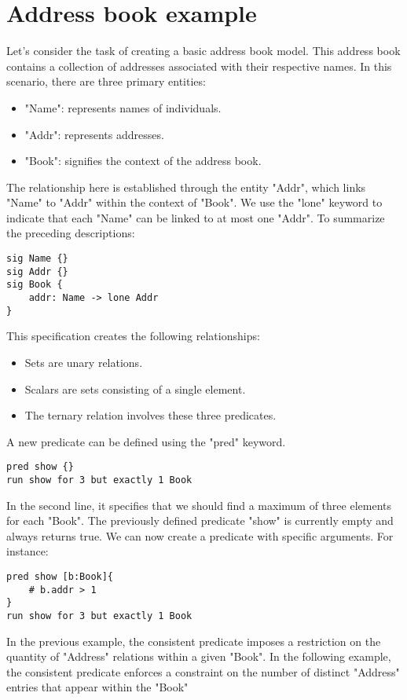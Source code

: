 \section{Address book example}

Let's consider the task of creating a basic address book model. 
This address book contains a collection of addresses associated with their respective names.
In this scenario, there are three primary entities:
\begin{itemize}
    \item "Name": represents names of individuals.
    \item "Addr": represents addresses.
    \item "Book": signifies the context of the address book.
\end{itemize}
The relationship here is established through the entity "Addr", which links "Name" to "Addr" within the context of "Book". 
We use the "lone" keyword to indicate that each "Name" can be linked to at most one "Addr". To summarize the preceding descriptions:
\begin{lstlisting}[language=alloy]
sig Name {}
sig Addr {}
sig Book {
    addr: Name -> lone Addr
}
\end{lstlisting}
This specification creates the following relationships: 
\begin{itemize}
    \item Sets are unary relations.
    \item Scalars are sets consisting of a single element.
    \item The ternary relation involves these three predicates.
\end{itemize}
A new predicate can be defined using the "pred" keyword.
\begin{lstlisting}[language=alloy]
pred show {}
run show for 3 but exactly 1 Book
\end{lstlisting}
In the second line, it specifies that we should find a maximum of three elements for each "Book". 
The previously defined predicate "show" is currently empty and always returns true.
We can now create a predicate with specific arguments. 
For instance:
\begin{lstlisting}[language=alloy]
pred show [b:Book]{
    # b.addr > 1
}
run show for 3 but exactly 1 Book
\end{lstlisting}
In the previous example, the consistent predicate imposes a restriction on the quantity of "Address" relations within a given "Book". 
In the following example, the consistent predicate enforces a constraint on the number of distinct "Address" entries that appear within the "Book"
